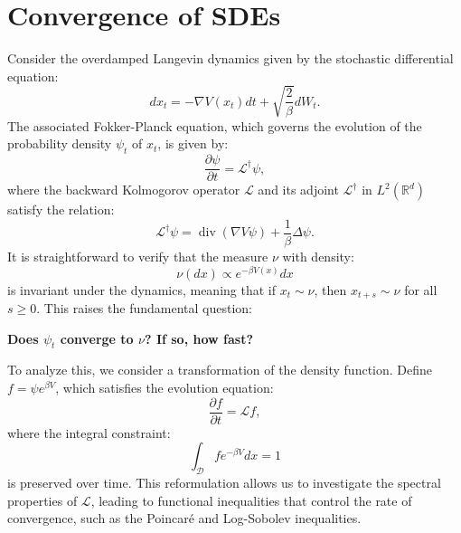 \documentclass[11pt, twoside]{report}
\begin{document}
\section{Convergence of SDEs}

Consider the overdamped Langevin dynamics given by the stochastic differential equation:
\begin{equation}
dx_t = -\nabla V(x_t) dt + \sqrt{\frac{2}{\beta}} dW_t.
\end{equation}
The associated Fokker-Planck equation, which governs the evolution of the probability density $\psi_t$ of $x_t$, is given by:
\begin{equation}
\frac{\partial \psi}{\partial t} = \mathcal{L}^{\dagger} \psi,
\end{equation}
where the backward Kolmogorov operator $\mathcal{L}$ and its adjoint $\mathcal{L}^{\dagger}$ in $L^2(\mathbb{R}^d)$ satisfy the relation:
\begin{equation}
\mathcal{L}^{\dagger} \psi = \operatorname{div} (\nabla V \psi) + \frac{1}{\beta} \Delta \psi.
\end{equation}
It is straightforward to verify that the measure $\nu$ with density:
\begin{equation}
\nu(dx) \propto e^{-\beta V(x)} dx
\end{equation}
is invariant under the dynamics, meaning that if $x_t \sim \nu$, then $x_{t+s} \sim \nu$ for all $s \geq 0$. This raises the fundamental question:

\begin{center}
\textbf{Does $\psi_t$ converge to $\nu$? If so, how fast?}
\end{center}

To analyze this, we consider a transformation of the density function. Define $f = \psi e^{\beta V}$, which satisfies the evolution equation:
\begin{equation}
\frac{\partial f}{\partial t} = \mathcal{L} f,
\end{equation}
where the integral constraint:
\begin{equation} \label{FP_reform}
\int_{\mathcal{D}} f e^{-\beta V} dx = 1
\end{equation}
is preserved over time. This reformulation allows us to investigate the spectral properties of $\mathcal{L}$, leading to functional inequalities that control the rate of convergence, such as the Poincar\'{e} and Log-Sobolev inequalities.
\end{document}
